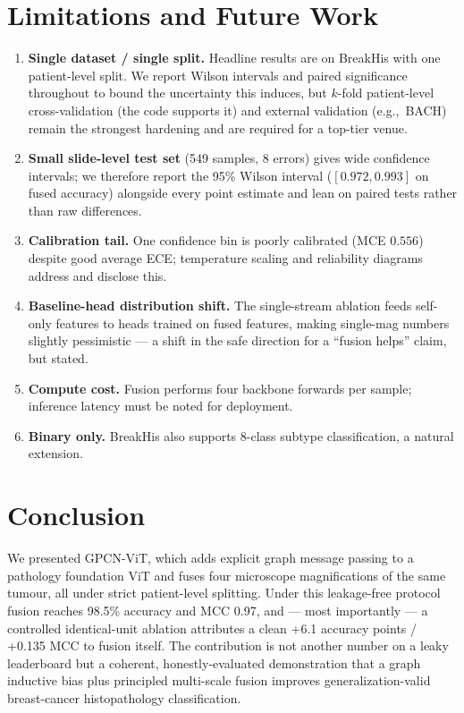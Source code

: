 \documentclass[11pt]{article}
\newcommand{\eg}{e.g.,\ }
\begin{document}
\section{Limitations and Future Work}
\label{sec:limits}

\begin{enumerate}
  \item \textbf{Single dataset / single split.} Headline results are on BreakHis
    with one patient-level split. We report Wilson intervals and paired significance
    throughout to bound the uncertainty this induces, but $k$-fold patient-level
    cross-validation (the code supports it) and external validation (\eg BACH)
    remain the strongest hardening and are required for a top-tier venue.
  \item \textbf{Small slide-level test set} (549 samples, 8 errors) gives wide
    confidence intervals; we therefore report the 95\% Wilson interval
    ($[0.972,0.993]$ on fused accuracy) alongside every point estimate and lean on
    paired tests rather than raw differences.
  \item \textbf{Calibration tail.} One confidence bin is poorly calibrated
    (MCE $0.556$) despite good average ECE; temperature scaling and reliability
    diagrams address and disclose this.
  \item \textbf{Baseline-head distribution shift.} The single-stream ablation
    feeds self-only features to heads trained on fused features, making single-mag
    numbers slightly pessimistic — a shift in the safe direction for a
    ``fusion helps'' claim, but stated.
  \item \textbf{Compute cost.} Fusion performs four backbone forwards per sample;
    inference latency must be noted for deployment.
  \item \textbf{Binary only.} BreakHis also supports 8-class subtype
    classification, a natural extension.
\end{enumerate}

\section{Conclusion}
\label{sec:conclusion}

We presented GPCN-ViT, which adds explicit graph message passing to a pathology
foundation ViT and fuses four microscope magnifications of the same tumour, all
under strict patient-level splitting. Under this leakage-free protocol fusion
reaches 98.5\% accuracy and MCC 0.97, and — most importantly — a controlled
identical-unit ablation attributes a clean +6.1 accuracy points / +0.135 MCC to
fusion itself. The contribution is not another number on a leaky leaderboard but a
coherent, honestly-evaluated demonstration that a graph inductive bias plus
principled multi-scale fusion improves generalization-valid breast-cancer
histopathology classification.



\end{document}
